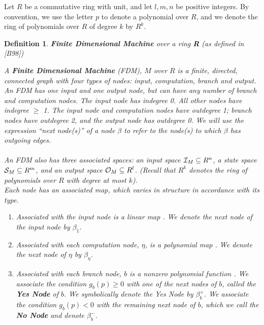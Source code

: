 \documentclass[twoside]{article}
\renewcommand{\cite}[1]{[#1]}
\newtheorem{definition}{Definition}[section]
\begin{document}
Let $R$ be a commutative ring with unit, and let $l, m, n$ be positive
integers.  By convention, we use the letter $p$ to denote a polynomial
over $R$, and we denote the ring of polynomials over $R$ of degree $k$
by $R^k$. 

\begin{definition}{\textbf{Finite Dimensional Machine} over a ring
    \textbf{R} (as defined in \cite{B98})}
  
  A \textbf{Finite Dimensional Machine} (FDM), $M$ over $R$ is a
  finite, directed, connected graph with four types of nodes:
  \emph{input, computation, branch} and \emph{output}.  An FDM has one
  input and one output node, but can have any number of branch and
  computation nodes. The input node has indegree 0.  All other nodes
  have indegree $\geq$ 1. The input node and computation nodes have
  outdegree 1; branch nodes have outdegree 2, and the output node has
  outdegree 0.  We will use the expression ``next node(s)'' of a node
  $\beta$ to refer to the node(s) to which $\beta$ has outgoing edges.\\
  
  \emph{}\\
  
  An FDM also has three associated spaces: an input space $\mathcal{I}_M
  \subseteq R^n$, a state space $\mathcal{S}_M \subseteq R^m$, and an
  output space $\mathcal{O}_M \subseteq R^l$.  (Recall that $R^k$
  denotes the ring of polynomials over $R$ with degree at most $k$).\\

  Each node has an associated map, which varies in structure in
  accordance with its type.
  \begin{enumerate}
  \item Associated with the input node is a linear map
    . We denote the next node
    of the input node by $\beta_1$.
    
  \item Associated with each computation node, $\eta$, is a polynomial
    map . We denote the
    next node of $\eta$ by $\beta_\eta$.
    
  \item Associated with each branch node, $b$ is a nonzero polynomial
    function .  We associate the
    condition $g_b(p) \geq 0$ with one of the next nodes of $b$,
    called the \textbf{Yes Node} of $b$.  We symbolically denote the
    Yes Node by $\beta_b^+$. We associate the condition $g_b(p) < 0$
    with the remaining next node of $b$, which we call the \textbf{No
      Node} and denote $\beta_b^-$.
    

\end{enumerate}
\end{definition}
\end{document}
